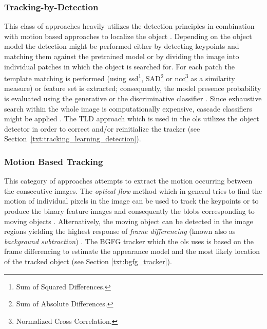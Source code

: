 \subsubsection*{Tracking-by-Detection}
This class of approaches heavily utilizes the detection principles in combination with motion based approaches to localize the object \cite{eth_biwi_00633, Kalal:2012:TRA:2225045.2225082}. Depending on the object model the detection might be performed either by detecting keypoints and matching them against the pretrained model \cite{FastKeypointRecognitionInTenLinesOfCode, DBLP:journals/corr/abs-1211-5829} or by dividing the image into individual patches in which the object is searched for. For each patch the template matching is performed \cite{AFastTemplateMatchingAlgorithm, ObjectTrackinginMonochromaticVideo} (using \gls{ssd}\footnote{Sum of Squared Differences.}, SAD\footnote{Sum of Absolute Differences.} or \gls{ncc}\footnote{Normalized Cross Correlation.} as a similarity measure) or feature set is extracted; consequently, the model presence probability is evaluated using the generative or the discriminative classifier \cite{EnhancedGaussianMixtureModels, EfficientScan-windowGPGPU}. Since exhaustive search within the whole image is computationally expensive, cascade classifiers might be applied \cite{violaJones, RobustObjectDetectionViaSoftCascade}. The TLD approach which is used in the \gls{ols} utilizes the object detector in order to correct and/or reinitialize the tracker (see Section~\ref{txt:tracking_learning_detection}).

\subsubsection*{Motion Based Tracking}
This category of approaches attempts to extract the motion occurring between the consecutive images. The \textit{optical flow} method which in general tries to find the motion of individual pixels in the image can be used to track the keypoints \cite{Bouguet00pyramidalimplementation} or to produce the binary feature images and consequently the blobs corresponding to moving objects \cite{aslani2013optical}. Alternatively, the moving object can be detected in the image regions yielding the highest response of \textit{frame differencing} (known also as \textit{background subtraction}) \cite{Noh2013, Movingobjectdetection}. The BGFG tracker which the \gls{ols} uses is based on the frame differencing to estimate the appearance model and the most likely location of the tracked object (see Section \ref{txt:bgfg_tracker}).


